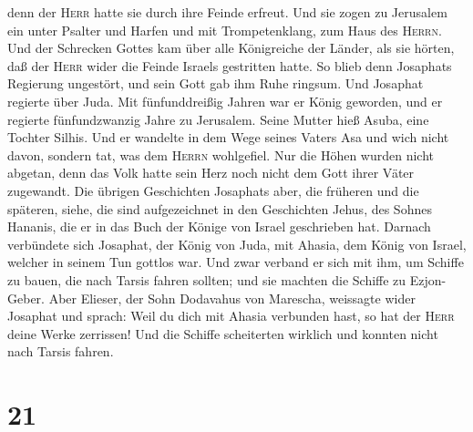 denn der \textsc{Herr} hatte sie durch ihre Feinde erfreut.
 Und sie zogen zu Jerusalem ein unter Psalter und Harfen
und mit Trompetenklang, zum Haus des \textsc{Herrn}.  Und
der Schrecken Gottes kam über alle Königreiche der Länder, als sie
hörten, daß der \textsc{Herr} wider die Feinde Israels gestritten hatte.
 So blieb denn Josaphats Regierung ungestört, und sein
Gott gab ihm Ruhe ringsum.  Und Josaphat regierte über
Juda. Mit fünfunddreißig Jahren war er König geworden, und er regierte
fünfundzwanzig Jahre zu Jerusalem. Seine Mutter hieß Asuba, eine Tochter
Silhis.  Und er wandelte in dem Wege seines Vaters Asa
und wich nicht davon, sondern tat, was dem \textsc{Herrn} wohlgefiel.
 Nur die Höhen wurden nicht abgetan, denn das Volk hatte
sein Herz noch nicht dem Gott ihrer Väter zugewandt.  Die
übrigen Geschichten Josaphats aber, die früheren und die späteren,
siehe, die sind aufgezeichnet in den Geschichten Jehus, des Sohnes
Hananis, die er in das Buch der Könige von Israel geschrieben hat.
 Darnach verbündete sich Josaphat, der König von Juda,
mit Ahasia, dem König von Israel, welcher in seinem Tun gottlos war.
 Und zwar verband er sich mit ihm, um Schiffe zu bauen,
die nach Tarsis fahren sollten; und sie machten die Schiffe zu
Ezjon-Geber.  Aber Elieser, der Sohn Dodavahus von
Marescha, weissagte wider Josaphat und sprach: Weil du dich mit Ahasia
verbunden hast, so hat der \textsc{Herr} deine Werke zerrissen! Und die
Schiffe scheiterten wirklich und konnten nicht nach Tarsis fahren.

\hypertarget{section-20}{%
\section{21}\label{section-20}}


